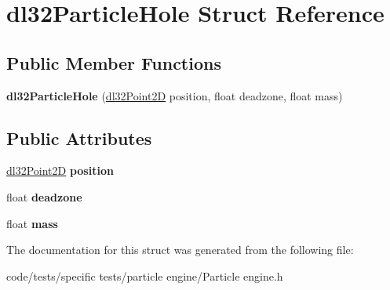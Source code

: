 \hypertarget{structdl32_particle_hole}{\section{dl32\-Particle\-Hole Struct Reference}
\label{structdl32_particle_hole}
}
\subsection*{Public Member Functions}
\begin{DoxyCompactItemize}
\item 
\hypertarget{structdl32_particle_hole_a81b0aef6e84215f45c4a9d682854eb96}{{\bfseries dl32\-Particle\-Hole} (\hyperlink{structdl32_point2_d}{dl32\-Point2\-D} position, float deadzone, float mass)}\label{structdl32_particle_hole_a81b0aef6e84215f45c4a9d682854eb96}

\end{DoxyCompactItemize}
\subsection*{Public Attributes}
\begin{DoxyCompactItemize}
\item 
\hypertarget{structdl32_particle_hole_ab8692b4188aaabd3ce42e80549a837ce}{\hyperlink{structdl32_point2_d}{dl32\-Point2\-D} {\bfseries position}}\label{structdl32_particle_hole_ab8692b4188aaabd3ce42e80549a837ce}

\item 
\hypertarget{structdl32_particle_hole_a83f2451b4a808c618cf073fd3bbcefff}{float {\bfseries deadzone}}\label{structdl32_particle_hole_a83f2451b4a808c618cf073fd3bbcefff}

\item 
\hypertarget{structdl32_particle_hole_a59d90102f4256a08b1949829551001d3}{float {\bfseries mass}}\label{structdl32_particle_hole_a59d90102f4256a08b1949829551001d3}

\end{DoxyCompactItemize}


The documentation for this struct was generated from the following file\-:\begin{DoxyCompactItemize}
\item 
code/tests/specific tests/particle engine/Particle engine.\-h\end{DoxyCompactItemize}
